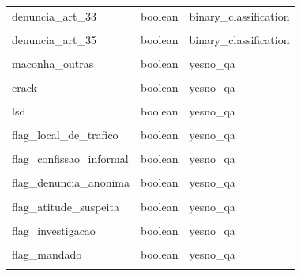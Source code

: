 \documentclass[
  12pt,
]{article}
\begin{document}
\begin{longtable}[t]{>{\raggedright\arraybackslash}p{15em}>{\raggedright\arraybackslash}p{17em}>{\raggedright\arraybackslash}p{17em}}
denuncia\_art\_33 & boolean & binary\_classification\\
\addlinespace
\cellcolor{gray!10}{denuncia\_art\_34} & \cellcolor{gray!10}{boolean} & \cellcolor{gray!10}{binary\_classification}\\
denuncia\_art\_35 & boolean & binary\_classification\\
\cellcolor{gray!10}{maconha} & \cellcolor{gray!10}{boolean} & \cellcolor{gray!10}{yesno\_qa}\\
maconha\_outras & boolean & yesno\_qa\\
\cellcolor{gray!10}{cocaina} & \cellcolor{gray!10}{boolean} & \cellcolor{gray!10}{yesno\_qa}\\
\addlinespace
crack & boolean & yesno\_qa\\
\cellcolor{gray!10}{ecstasy} & \cellcolor{gray!10}{boolean} & \cellcolor{gray!10}{yesno\_qa}\\
lsd & boolean & yesno\_qa\\
\cellcolor{gray!10}{outras\_drogas} & \cellcolor{gray!10}{boolean} & \cellcolor{gray!10}{yesno\_qa}\\
flag\_local\_de\_trafico & boolean & yesno\_qa\\
\addlinespace
\cellcolor{gray!10}{flag\_preso\_no\_momento\_da\_sentenca} & \cellcolor{gray!10}{boolean} & \cellcolor{gray!10}{yesno\_qa}\\
flag\_confissao\_informal & boolean & yesno\_qa\\
\cellcolor{gray!10}{flag\_confissao} & \cellcolor{gray!10}{boolean} & \cellcolor{gray!10}{yesno\_qa}\\
flag\_denuncia\_anonima & boolean & yesno\_qa\\
\cellcolor{gray!10}{flag\_denuncia} & \cellcolor{gray!10}{boolean} & \cellcolor{gray!10}{yesno\_qa}\\
\addlinespace
flag\_atitude\_suspeita & boolean & yesno\_qa\\
\cellcolor{gray!10}{flag\_divergencias\_nos\_relatos\_dos\_policiais} & \cellcolor{gray!10}{boolean} & \cellcolor{gray!10}{yesno\_qa}\\
flag\_investigacao & boolean & yesno\_qa\\
\cellcolor{gray!10}{flag\_interceptacao} & \cellcolor{gray!10}{boolean} & \cellcolor{gray!10}{yesno\_qa}\\
flag\_mandado & boolean & yesno\_qa\\
\addlinespace
\cellcolor{gray!10}{local} & \cellcolor{gray!10}{categorical} & \cellcolor{gray!10}{multiclass\_classification}\\

\end{longtable}
\end{document}
